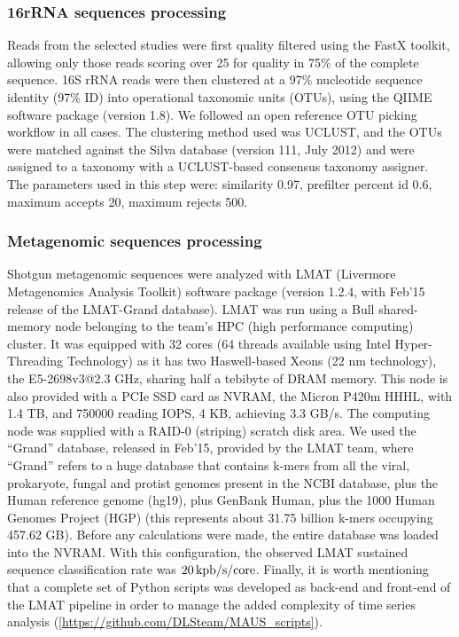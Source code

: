 \subsubsection*{16rRNA sequences processing}
Reads from the selected studies were first quality filtered using the FastX toolkit\cite{FASTX}, allowing only those reads scoring over 25 for quality in  75\% of the complete sequence. 16S rRNA reads were then clustered at a 97\% nucleotide sequence identity (97\% ID) into operational taxonomic units (OTUs), using the QIIME software package\cite{QIIME} (version 1.8). We followed an open reference OTU picking workflow in all cases. The clustering method used was UCLUST, and the OTUs were matched against the Silva database\cite{SILVA} (version 111, July 2012) and were assigned to a taxonomy with a UCLUST-based consensus taxonomy assigner. The parameters used in this step were: similarity 0.97, prefilter percent id 0.6, maximum accepts 20, maximum rejects 500. 

\subsubsection*{Metagenomic sequences processing}
Shotgun metagenomic sequences were analyzed with LMAT (Livermore Metagenomics Analysis Toolkit) software package\cite{LMAT} (version 1.2.4, with Feb'15 release of the LMAT-Grand database). LMAT was run using a Bull shared-memory node belonging to the team's HPC (high performance computing) cluster. It was equipped with 32 cores (64 threads available using Intel Hyper-Threading Technology) as it has two Haswell-based Xeons (22 nm technology), the E5-2698v3@2.3 GHz, sharing half a tebibyte of DRAM memory. This node is also provided with a PCIe SSD card as NVRAM, the Micron P420m HHHL, with 1.4 TB, and 750000 reading IOPS, 4 KB, achieving 3.3 GB/s. The computing node was supplied with a RAID-0 (striping) scratch disk area. We used the ``Grand'' database\cite{LMAT2}, released in Feb'15, provided by the LMAT team, where ``Grand'' refers to a huge database that contains k-mers from all the viral, prokaryote, fungal and protist genomes present in the NCBI database, plus the Human reference genome (hg19), plus GenBank Human, plus the 1000 Human Genomes Project (HGP) (this represents about 31.75 billion k-mers occupying 457.62 GB)\cite{LMAT2}. Before any calculations were made, the entire database was loaded into the NVRAM. With this configuration, the observed LMAT sustained sequence classification rate was $20\operatorname{kpb/s/core}$. Finally, it is worth mentioning that a complete set of Python scripts  was developed as back-end and front-end of the LMAT pipeline in order to manage the added complexity of time series analysis (\href{https://github.com/DLSteam/MAUS_scripts}{[https://github.com/DLSteam/MAUS\_scripts]}). 

